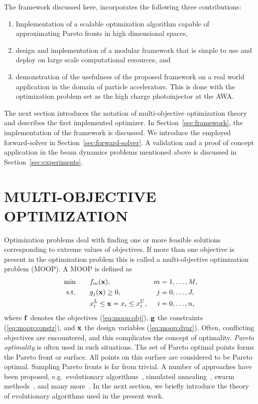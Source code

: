 \documentclass[preprint,linenumbers,amsmath,amssymb,aps,prstab]{revtex4-1}%
\begin{document}
The framework discussed here, incorporates the following three contributions:
%
\begin{enumerate}
  \item Implementation of a scalable optimization algorithm capable of
        approximating Pareto fronts in high dimensional spaces,
  \item design and implementation of a modular framework that is simple to use
        and deploy on large scale computational resources, and
  \item demonstration of the usefulness of the proposed framework on a real world
        application in the domain of particle accelerators. This is done
        with the optimization problem set as 
        the high charge photoinjector at the AWA. 
\end{enumerate}

The next section introduces the notation of multi-objective optimization
theory and describes the first implemented optimizer.
In Section~\ref{sec:framework}, the implementation of the framework is discussed.
We introduce the employed forward-solver in Section~\ref{sec:forward-solver}.
A validation and a proof of concept application in the beam dynamics problems 
mentioned above is discussed in Section~\ref{sec:experiments}.


\section{MULTI-OBJECTIVE OPTIMIZATION} \label{sec:optimization}

Optimization problems deal with finding one or more feasible solutions
  corresponding to extreme values of objectives.
If more than one objective is present in the optimization problem this is called
  a multi-objective optimization problem (MOOP).
A MOOP is defined as
%
\begin{align}
  \text{ min} \quad & \quad f_m({\bf x}), ~& m &= 1, \dots, M, \label{eq:moop:obj}\\
  \text{s.t.} \quad & \quad g_j({\bf x}) \geq 0, & j &= 0, \dots, J,
  \label{eq:moop:constr}\\
  \quad & \quad  x_i^L \leq {\bf x}=x_i \leq x_i^U,& i &=0, \dots, n
  \label{eq:moop:dvar} \text{,}
\end{align}
%
where $\bf f$ denotes the objectives (\ref{eq:moop:obj}),
  $\bf g$ the constraints (\ref{eq:moop:constr}),
  and $\bf x$ the design variables (\ref{eq:moop:dvar}).
Often, conflicting objectives are encountered, and this complicates the concept of
  optimality. \textit{Pareto optimality} is often used in such situations.
The set of Pareto optimal points forms the Pareto front or
  surface.
All points on this surface are considered to be Pareto optimal.
Sampling Pareto fronts is far from trivial.
A number of approaches have been proposed,
  e.g.\ evolutionary algorithms~\cite{deb:09},
  simulated annealing~\cite{kigv:83},
  swarm methods~\cite{keeb:95},
  and many more~\cite{domc:96,cati:02,kara:05,hoss:09}.
In the next section, we briefly introduce the theory of evolutionary algorithms
  used in the present work.
\end{document}
